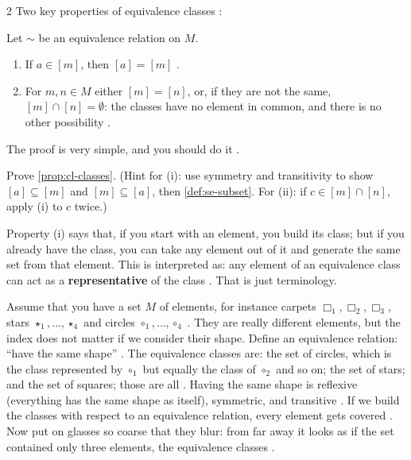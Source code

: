 \begin{paracol}{2}
Two key properties of equivalence classes :

\begin{proposition}\label{prop:cl-classes}
Let $\sim$ be an equivalence relation on $M$.
\begin{enumerate}
  \item[(i)] If $a\in[m]$, then $[a]=[m]$ .
  \item[(ii)] For $m,n\in M$ either $[m]=[n]$, or, if they are not the same, $[m]\cap[n]=\emptyset$: the classes have no
        element in common, and there is no other possibility .
\end{enumerate}
\end{proposition}
The proof is very simple, and you should do it .

\begin{exercise}\label{ex:cl-classes}
Prove \cref{prop:cl-classes}. (Hint for (i): use symmetry and transitivity to show $[a]\subseteq[m]$ and $[m]\subseteq[a]$,
then \cref{def:se-subset}. For (ii): if $c\in[m]\cap[n]$, apply (i) to $c$ twice.)
\end{exercise}

Property (i) says that, if you start with an element, you build its class; but if you already have the class, you can take
any element out of it and generate the same set from that element. This is interpreted as: any element of an equivalence
class can act as a \textbf{representative} of the class . That is just
terminology.

\begin{intuition}\label{int:cl-shapes}
Assume that you have a set $M$ of elements, for instance carpets $\Box_1,\Box_2,\Box_3$, stars $\star_1,\dots,\star_4$ and
circles $\circ_1,\dots,\circ_4$ . They are really different elements, but
the index does not matter if we consider their shape. Define an equivalence relation: ``have the same shape''
. The equivalence classes are: the set of circles, which is the class represented by $\circ_1$ but equally
the class of $\circ_2$ and so on; the set of stars; and the set of squares; those are all .
Having the same shape is reflexive (everything has the same shape as itself), symmetric, and transitive
. If we build the classes with respect to an equivalence relation, every element gets
covered . Now put on glasses so coarse that they blur: from far away it looks as if the set contained only
three elements, the equivalence classes .
\end{intuition}


\end{paracol}
